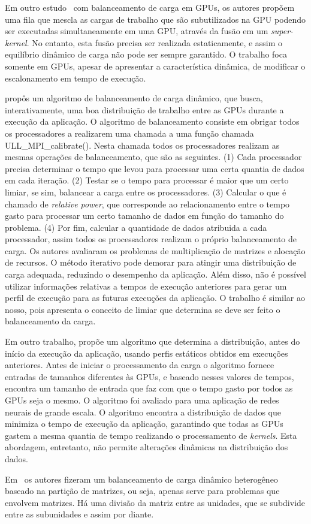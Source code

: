 Em outro estudo~\citep{tasks} com balanceamento de carga em GPUs, os autores propõem uma fila que mescla as cargas de trabalho que são subutilizados na GPU podendo ser executadas simultaneamente em uma GPU, através da fusão em um \textit{super-kernel}. No entanto, esta fusão precisa ser realizada estaticamente, e assim o equilíbrio dinâmico de carga não pode ser sempre garantido. O trabalho foca somente em GPUs, apesar de apresentar a característica dinâmica, de modificar o escalonamento em tempo de execução.

\citep{acosta} propôs um algoritmo de balanceamento de carga
dinâmico, que busca, interativamente, uma boa distribuição de trabalho entre as
GPUs durante a execução da aplicação. O algoritmo de balanceamento consiste em obrigar todos os processadores a realizarem uma chamada a uma função chamada ULL\_MPI\_calibrate(). Nesta chamada todos os processadores realizam as mesmas operações de balanceamento, que são as seguintes. (1) Cada processador precisa determinar o tempo que levou para processar uma certa quantia de dados em cada iteração. (2) Testar se o tempo para processar é maior que um certo limiar, se sim, balancear a carga entre os processadores. (3) Calcular o que é chamado de \emph{relative power}, que corresponde ao relacionamento entre o tempo gasto para processar um certo tamanho de dados em função do tamanho do problema. (4) Por fim, calcular a quantidade de dados atribuida a cada processador, assim todos os processadores realizam o próprio balanceamento de carga. Os autores avaliaram os problemas de
multiplicação de matrizes e alocação de recursos. O método iterativo pode
demorar para atingir uma distribuição de carga adequada, reduzindo o desempenho
da aplicação. Além disso, não é possível utilizar informações relativas a tempos
de execução anteriores para gerar um perfil de execução para as futuras
execuções da aplicação. O trabalho é similar ao nosso, pois apresenta o conceito de limiar que determina se deve ser feito o balanceamento da carga.

Em outro trabalho, \citep{raphael} propõe um algoritmo que determina a
distribuição, antes do início da execução da aplicação, usando perfis estáticos
obtidos em execuções anteriores. Antes de iniciar o processamento da carga o algoritmo fornece entradas de tamanhos diferentes às GPUs, e baseado nesses valores de tempos, encontra um tamanho de entrada que faz com que o tempo gasto por todos as GPUs seja o mesmo.
O algoritmo foi avaliado para uma aplicação de
redes neurais de grande escala. O algoritmo encontra a distribuição de dados que
minimiza o tempo de execução da aplicação, garantindo que todas as GPUs gastem a
mesma quantia de tempo realizando o processamento de \emph{kernels}. Esta
abordagem, entretanto, não permite alterações dinâmicas na distribuição dos
dados. 

Em~\citep{Clarke:2012:HPA:2402420.2402479}  os autores fizeram um balanceamento de carga dinâmico heterogêneo baseado na partição de matrizes, ou seja, apenas serve para problemas que envolvem matrizes. Há uma divisão da matriz entre as unidades, que se subdivide entre as subunidades e assim por diante. 







